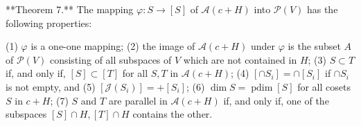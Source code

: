 **Theorem 7.** The mapping $\varphi: S \rightarrow [S]$ of $\mathcal{A}(c+H)$ into $\mathcal{P}(V)$ has the following properties:

(1) $\varphi$ is a one-one mapping;
(2) the image of $\mathcal{A}(c+H)$ under $\varphi$ is the subset $A$ of $\mathcal{P}(V)$ consisting of all subspaces of $V$ which are not contained in $H$;
(3) $S \subset T$ if, and only if, $[S] \subset [T]$ for all $S, T$ in $\mathcal{A}(c+H)$;
(4) $[\cap S_i] = \cap [S_i]$ if $\cap S_i$ is not empty, and
(5) $[\mathcal{J}(S_i)] = + [S_i]$;
(6) $\dim S = \operatorname{pdim} [S]$ for all cosets $S$ in $c+H$;
(7) $S$ and $T$ are parallel in $\mathcal{A}(c+H)$ if, and only if, one of the subspaces $[S] \cap H, [T] \cap H$ contains the other.
